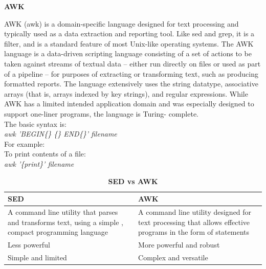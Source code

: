 \documentclass[12pt]{article}
\begin{document}
\begin{center}
    {\Large{\textbf{AWK}}}
\end{center}
\fbox
{
\begin{minipage}{\textwidth}
    AWK (awk) is a domain-specific language designed for text processing and 
    typically used as a data extraction and reporting tool. Like sed and grep, 
    it is a filter, and is a standard feature of most Unix-like operating 
    systems.
    The AWK language is a data-driven scripting language consisting of a set of 
    actions to be taken against streams of textual data – either run directly on files
    or used as part of a pipeline – for purposes of extracting or transforming text, 
    such as producing formatted reports. The language extensively uses the string 
    datatype, associative arrays (that is, arrays indexed by key strings), and 
    regular expressions. While AWK has a limited intended application domain and was 
    especially designed to support one-liner programs, the language is Turing-
    complete.\\
    The basic syntax is:\\
    \emph{awk 'BEGIN\{\} \{\} END\{\}' filename}\\
    For example:\\
    To print contents of a file:\\
    \emph{awk '\{print\}' filename} \cite{geeksforgeeks}
\end{minipage}
}
\newpage
\setlength{\arrayrulewidth}{0.5mm}
\begin{center}
    \begin{table}
        \label{sedvsawk}
        \caption{\label{tab:sedvsawk}\textbf{\Large{SED vs AWK}}}
        \renewcommand{\arraystretch}{4}
        \begin{tabular}{|P{0.45\textwidth}|P{0.45\textwidth}|}
            \hline
            \textbf{SED} & \textbf{AWK}
            \\ \hline
            A command line utility that parses and transforms text, using a simple
            , compact programming language & A command line utility designed for text
            processing that allows effective programs in the form of statements\\ 
            \hline
            Less powerful & More powerful and robust\\ 
            \hline
            Simple and limited & Complex and versatile\\
            \hline
        \end{tabular}
    \end{table}
\end{center}
\end{document}
